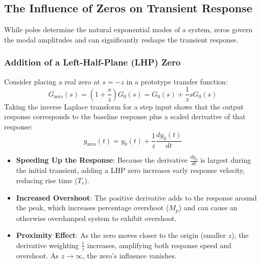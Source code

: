 \documentclass[12pt,onecolumn,twoside ]{article}
\begin{document}
	\subsection{The Influence of Zeros on Transient Response}
	While poles determine the natural exponential modes of a system, zeros govern the modal amplitudes and can significantly reshape the transient response.
	\subsubsection{Addition of a Left-Half-Plane (LHP) Zero}
	Consider placing a real zero at $s = -z$ in a prototype transfer function: \[
	G_{\text{zero}}(s) = \left(1 + \frac{s}{z}\right) G_0(s) = G_0(s) + \frac{1}{z} s G_0(s)
	\]
	Taking the inverse Laplace transform for a step input shows that the output response corresponds to the baseline response plus a scaled derivative of that response: \[
	y_{\text{zero}}(t) = y_0(t) + \frac{1}{z} \frac{dy_0(t)}{dt}
	\]
	\begin{itemize}
		\item
		\textbf{Speeding Up the Response}: Because the derivative $\frac{dy_0}{dt}$ is largest during the initial transient, adding a LHP zero increases early response velocity, reducing rise time ($T_r$).
		\item
		\textbf{Increased Overshoot}: The positive derivative adds to the response around the peak, which increases percentage overshoot ($M_p$) and can cause an otherwise overdamped system to exhibit overshoot.
		\item
		\textbf{Proximity Effect}: As the zero moves closer to the origin (smaller $z$), the derivative weighting $\frac{1}{z}$ increases, amplifying both response speed and overshoot. As $z \to \infty$, the zero's influence vanishes.
	\end{itemize}
\end{document}
